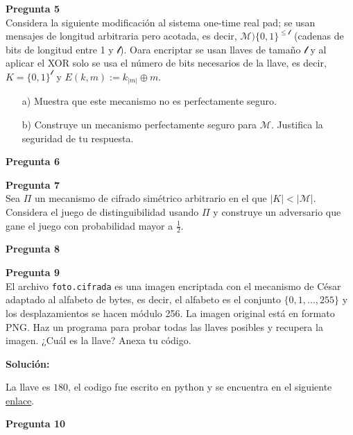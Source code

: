 \documentclass{article}
\newenvironment{problem}[2][Pregunta]
    { \begin{mdframed}[backgroundcolor=gray!20] \textbf{#1 #2} \\}
    {  \end{mdframed}}
\begin{document}
\begin{problem}{5}
  Considera la siguiente modificación al sistema one-time real pad; se usan mensajes de longitud
  arbitraria pero acotada, es decir, $\mathcal{M} ) \{0,1\}^{\leq\mathcal{l}}$ (cadenas de bits de
  longitud entre 1 y $\mathcal{l}$). Oara encriptar se usan llaves de tamaño $\mathcal{l}$ y
  al aplicar el {\rm XOR} solo se usa el número de bits necesarios de la llave, es decir,
  $K = \{0,1\}^\mathcal{l}$ y $E(k,m):=k_{|m|} \oplus m$.

  \begin{enumerate}
  \item[a)] Muestra que este mecanismo no es perfectamente seguro.
    
  \item[b)] Construye un mecanismo perfectamente seguro para $\mathcal{M}$.
    Justifica la seguridad de tu respuesta.
  \end{enumerate}
\end{problem}

\begin{problem}{6}
  
\end{problem}

\begin{problem}{7}
  Sea $\Pi$ un mecanismo de cifrado simétrico arbitrario en el que $|K| < |\mathcal{M}|$.
  Considera el juego de distinguibilidad usando $\Pi$ y construye un adversario que gane
  el juego con probabilidad mayor a $\frac{1}{2}$.
\end{problem}

\begin{problem}{8}
  
\end{problem}

\begin{problem}{9}
  El archivo {\tt foto.cifrada} es una imagen encriptada con el mecanismo de César adaptado al
  alfabeto de bytes, es decir, el alfabeto es el conjunto $\{0,1,. . ., 255\}$ y los
  desplazamientos se hacen módulo 256. La imagen original está en formato PNG. Haz un programa
  para probar todas las llaves posibles y recupera la imagen. ¿Cuál es la llave? Anexa tu código.
\end{problem}

{\bf Solución:}

La llave es $180$, el codigo fue escrito en python y se encuentra en el siguiente
\href{https://github.com/DiegoMendezMedina/Cripto-Seguridad/tree/main/Tareas/01/src/9.py}{enlace}.

\begin{problem}{10}
  
\end{problem}
\end{document}
